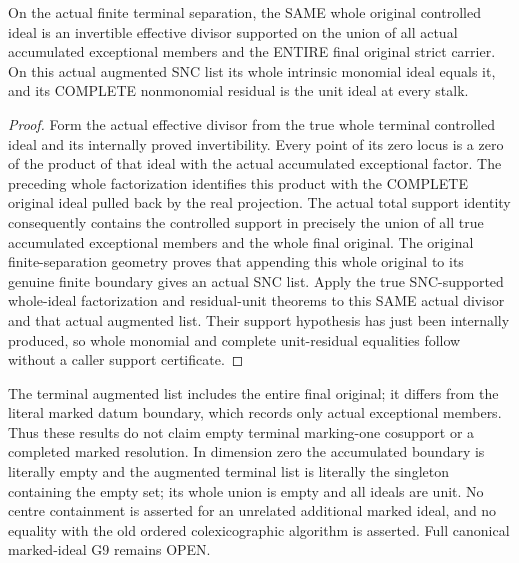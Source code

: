 \begin{theorem}
\label{hir:general-nc-original-controlled-snc-unit}
\leanok
On the actual finite terminal separation, the SAME whole original controlled
ideal is an invertible effective divisor supported on the union of all actual
accumulated exceptional members and the ENTIRE final original strict carrier.
On this actual augmented SNC list its whole intrinsic monomial ideal equals
it, and its COMPLETE nonmonomial residual is the unit ideal at every stalk.
\end{theorem}
\begin{proof}
Form the actual effective divisor from the true whole terminal controlled ideal
and its internally proved invertibility. Every point of its zero locus is a
zero of the product of that ideal with the actual accumulated exceptional
factor. The preceding whole factorization identifies this product with the
COMPLETE original ideal pulled back by the real projection. The actual total
support identity consequently contains the controlled support in precisely
the union of all true accumulated exceptional members and the whole final
original. The original finite-separation geometry proves that appending this
whole original to its genuine finite boundary gives an actual SNC list. Apply
the true SNC-supported whole-ideal factorization and residual-unit theorems to
this SAME actual divisor and that actual augmented list. Their support
hypothesis has just been internally produced, so whole monomial and complete
unit-residual equalities follow without a caller support certificate.
\end{proof}

\begin{remark}
The terminal augmented list includes the entire final original; it differs
from the literal marked datum boundary, which records only actual exceptional
members. Thus these results do not claim empty terminal marking-one cosupport
or a completed marked resolution. In dimension zero the accumulated boundary
is literally empty and the augmented terminal list is literally the singleton
containing the empty set; its whole union is empty and all ideals are unit.
No centre containment is asserted for an unrelated additional marked ideal,
and no equality with the old ordered colexicographic algorithm is asserted.
Full canonical marked-ideal G9 remains OPEN.
\end{remark}
